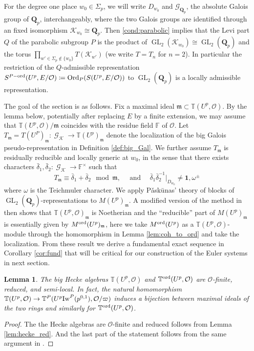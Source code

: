 \documentclass[leqno]{amsart}
\newtheorem{lem}[thm]{Lemma}
\theoremstyle{definition}
\theoremstyle{remark}
\newcommand{\id}{\mathbf{1}}
\newcommand{\oo}{\mathcal{O}}
\newcommand{\fF}{\mathbb{F}} %
\newcommand{\Qp}{\mathbf{Q}_p}
\DeclareMathOperator{\GL}{GL}
\DeclareMathOperator{\Gal}{\mathcal{G}}
\newcommand{\fm}{\mathfrak{m}}
\DeclareMathOperator{\Ord}{Ord} %
\newcommand{\Gp}{\mathcal{G}_{\Qp}} %
\newcommand{\K}{{\mathcal{K}}} %
\newcommand{\Iw}{\textnormal{Iw}} %
\newcommand{\TT}{\mathbb{T}} %
\newcommand{\ord}{\textnormal{ord}} %
\begin{document}
For the degree one place $w_0\in \Sigma_p$,
we will write $D_{w_0}$ and $\Gp$,
the absolute Galois group of  $\Qp$, interchangeably,
where the two Galois groups are identified 
through an fixed isomorphism $\K_{w_0}\cong \Qp$.
Then \eqref{cond:parabolic}
implies that the Levi part $Q$
of the parabolic subgroup $P$
is the product of $\GL_2(\K_{w_0})\cong \GL_2(\Qp)$
and the torus $\prod_{w'\in\Sigma_p\notin\{w_0\}}T(\K_{w'})$
(we write $T=T_n$ for $n=2$).
In particular the restriction of the $Q$-admissible representation
$S^{P-\ord}(U^p,E/\oo)\coloneqq \Ord_P(S(U^p,E/\oo))$
to $\GL_2(\Qp)$
is a locally admissible representation.

The goal of the section is as follows.
Fix a maximal ideal $\fm\subset \TT(U^p,\oo)$.
By the lemma below,
potentially after replacing $E$ by a finite extension,
we may assume that 
$\TT(U^p,\oo)/\fm$ coincides with the residue field $\fF$ of $\oo$.
Let $T_{\fm}=T(U^P)_{\fm}\colon \Gal_\K\to \TT(U^p)_{\fm}$
denote the localization of 
the big Galois pseudo-representation in 
Definition \ref{def:big_Gal}.
We further assume  $T_{\fm}$ is 
residually reducible and locally generic at $w_0$,
in the sense that there exists characters
$\bar{\delta}_1, \bar{\delta}_2\colon \Gal_{\K}\to \fF^\times$
such that 
\begin{equation}\tag{red.gen}\label{cond:red_gen}
	T_\fm\equiv \bar{\delta}_1+\bar{\delta}_2
	\mod \fm,\quad
    \text{ and }\quad
	\bar{\delta}_1\bar{\delta}_2^{-1} \vert_{D_{w_0}}
	\neq \id,\omega^{\pm}
\end{equation}
where $\omega$ is the Teichmuler character.
We apply P\v{a}sk\={u}nas' theory of blocks
of $\GL_2(\Qp)$-representations
to $M(U^p)_{\fm}$.
A modified version of the method in \cite{urban}
then shows that $\TT(U^p,\oo)_{\fm}$ is Noetherian
and the ``reducible'' part of  $M(U^p)_{\fm}$
is essentially given by $M^{\ord}(U^p)_{\fm}$,
here we take $M^{\ord}(U^p)$
as a $\TT(U^p,\oo)$-module 
through the homomorphism in Lemma \ref{lem:coh_to_ord}
and take the localization.
From these result we derive a fundamental exact sequence
in Corollary \ref{cor:fund} that will be critical
for our construction of the Euler systems in next section.


\begin{lem}\label{lem:big_red}
The big Hecke algebras 
$\TT(U^p,\oo)$ and $\TT^{\ord}(U^p,\oo)$
are $\oo$-finite, reduced, and semi-local.
In fact, the natural homomorphism
$\TT(U^p,\oo)\to \TT^P(U^p\Iw^P(p^{0,1}),\oo/\varpi)$ 
induces a bijection between maximal ideals of the two rings
and similarly for $\TT^{\ord}(U^p,\oo)$.
\end{lem}
\begin{proof}
The the Hecke algebras are $\oo$-finite and reduced
follows from Lemma \ref{lem:hecke_red}.
And the last part of the statement
follows from the same argument
in \cite[Prop 3.3.6]{pan}.
\end{proof}
\end{document}
